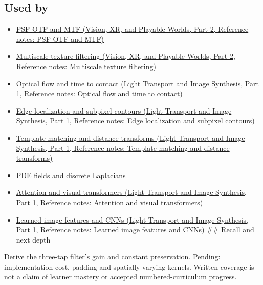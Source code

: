 \subsection{Used by}\label{appendix-d5b3c692d9f0-used-by}

\hypertarget{appendix-d5b3c692d9f0-used-by}{}

\begin{itemize}
\item
  \href{../07-Vision-XR-and-Playable-Worlds-P02/main.pdf\#nameddest=appendix-8b76b0efd27f}{PSF OTF and MTF (Vision, XR, and Playable Worlds, Part 2, Reference notes: PSF OTF and MTF)}
\item
  \href{../07-Vision-XR-and-Playable-Worlds-P02/main.pdf\#nameddest=appendix-b677a85ba76f}{Multiscale texture filtering (Vision, XR, and Playable Worlds, Part 2, Reference notes: Multiscale texture filtering)}
\item
  \href{../04-Light-Transport-and-Image-Synthesis-P01/main.pdf\#nameddest=appendix-e2e73f8cd93e}{Optical flow and time to contact (Light Transport and Image Synthesis, Part 1, Reference notes: Optical flow and time to contact)}
\item
  \href{../04-Light-Transport-and-Image-Synthesis-P01/main.pdf\#nameddest=appendix-36022286b03e}{Edge localization and subpixel contours (Light Transport and Image Synthesis, Part 1, Reference notes: Edge localization and subpixel contours)}
\item
  \href{../04-Light-Transport-and-Image-Synthesis-P01/main.pdf\#nameddest=appendix-5fb4af80d1c7}{Template matching and distance transforms (Light Transport and Image Synthesis, Part 1, Reference notes: Template matching and distance transforms)}
\item
  \hyperref[appendix-1988d465c119]{PDE fields and discrete Laplacians}
\item
  \href{../04-Light-Transport-and-Image-Synthesis-P01/main.pdf\#nameddest=appendix-a9d5dfdd164a}{Attention and visual transformers (Light Transport and Image Synthesis, Part 1, Reference notes: Attention and visual transformers)}
\item
  \href{../04-Light-Transport-and-Image-Synthesis-P01/main.pdf\#nameddest=appendix-47c51ea026fb}{Learned image features and CNNs (Light Transport and Image Synthesis, Part 1, Reference notes: Learned image features and CNNs)} \#\# Recall and next depth
\end{itemize}

Derive the three-tap filter's gain and constant preservation. Pending: implementation cost, padding and spatially varying kernels. Written coverage is not a claim of learner mastery or accepted numbered-curriculum progress.

